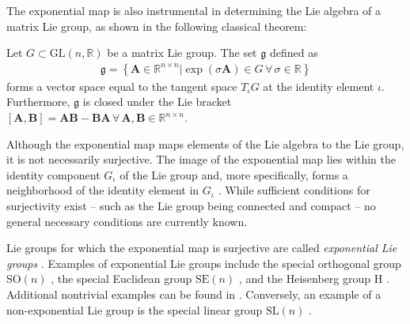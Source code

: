 The exponential map is also instrumental in determining the Lie algebra of a matrix Lie group, as shown in the following classical theorem:
\begin{theorem}
    Let $G\subset\text{GL}(n, \mathbb{R})$ be a matrix Lie group. The set $\mathfrak{g}$ defined as
    \begin{align}
        \mathfrak{g} = \left\{\mathbf{A}\in\mathbb{R}^{n\times n} | \exp(\sigma\mathbf{A})\in G\,\forall\,\sigma\in\mathbb{R}\right\}
    \end{align}
    forms a vector space equal to the tangent space $T_\iota G$ at the identity element $\iota$. Furthermore, $\mathfrak{g}$ is closed under the Lie bracket $[\mathbf{A}, \mathbf{B}] = \mathbf{A}\mathbf{B} - \mathbf{B}\mathbf{A}\,\forall\,\mathbf{A},\mathbf{B}\in\mathbb{R}^{n\times n}$.\hfill\qedsymbol
\end{theorem}

Although the exponential map maps elements of the Lie algebra to the Lie group, it is not necessarily surjective. The image of the exponential map lies within the identity component $G_\iota$ of the Lie group and, more specifically, forms a neighborhood of the identity element in $G_\iota$ \citep[p. 56]{Hall2015}. While sufficient conditions for surjectivity exist -- such as the Lie group being connected and compact \citep[p. 316]{Hall2015} -- no general necessary conditions are currently known.

Lie groups for which the exponential map is surjective are called \emph{exponential Lie groups} \citep{djokovic1995exponential}. Examples of exponential Lie groups include the special orthogonal group $\text{SO}(n)$ \citep[p. 28]{Gallier2020}, the special Euclidean  group $\text{SE}(n)$ \citep[p. 42]{Gallier2020}, and the Heisenberg group $\text{H}$ \citep[p. 75]{Hall2015}. Additional nontrivial examples can be found in \citet{djokovic1995exponential}. Conversely, an example of a non-exponential Lie group is the special linear group $\text{SL}(n)$ \citep[p. 28]{Gallier2020}.
